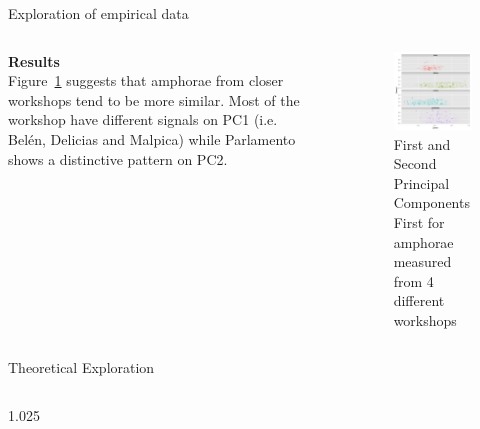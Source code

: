 \documentclass[final]{beamer}
\newlength{\sepwid}
\newlength{\onecolwid}
\newlength{\twocolwid}
\begin{document}
\begin{frame}[t]
\begin{columns}[t]
\begin{column}{\twocolwid}
\begin{block}{Exploration of empirical data}
\begin{columns}[t,totalwidth=\twocolwid]
\begin{column}{\onecolwid}
\vspace{1cm}
{\textbf{Results}}\\
\justify
Figure~\ref{fig:pca} suggests that amphorae from closer workshops tend to be more similar. Most of the workshop have different signals on PC1 (i.e. Bel\'en, Delicias and Malpica) while Parlamento shows a distinctive pattern on PC2.


\end{column}

\begin{column}{\sepwid}\end{column} %

\begin{column}{\onecolwid} %


\begin{figure}
\includegraphics[width=0.6\linewidth]{images/fig2.png}
\caption{First and Second Principal Components First for amphorae measured from 4 different workshops}
\label{fig:pca}
\end{figure}

\end{column}
\end{columns}

\end{block}

\begin{block}{Theoretical Exploration}

\begin{columns}[t,totalwidth=\twocolwid]

\begin{column}{1.025\onecolwid} %


\end{column}
\end{columns}
\end{block}
\end{column}
\end{columns}
\end{frame}
\end{document}
